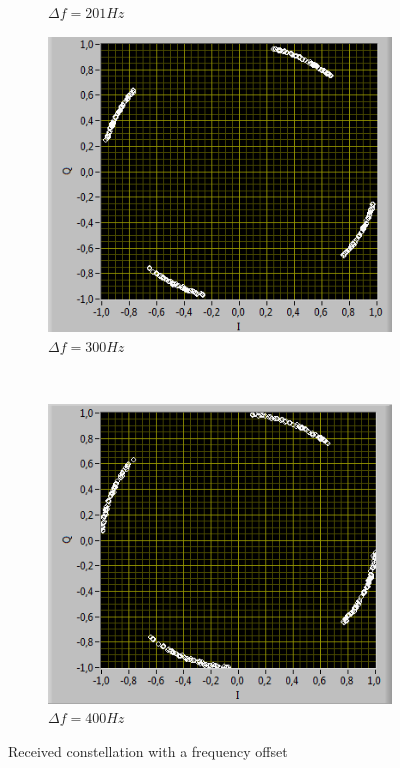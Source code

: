 \documentclass{article}
\begin{document}
\begin{figure}[h!]
\begin{subfigure}[b]{0.3 \textwidth}
	                \caption{$\Delta f = 201Hz$}\label{fig:4}
	            \end{subfigure}
	            
	            \begin{subfigure}[b]{0.3 \textwidth}
	                \includegraphics[width=\textwidth]{off300.PNG}
	                \caption{$\Delta f = 300Hz$}\label{fig:10}
	            \end{subfigure}
	            ~	           
	            \begin{subfigure}[b]{0.3 \textwidth}
	           \includegraphics[width=\textwidth]{off400.PNG}
	                \caption{$\Delta f = 400Hz$}\label{fig:20}
	            \end{subfigure}
	            \caption{Received constellation with a frequency offset}\label{fig:shi}
	        \end{figure}	
\end{document}
